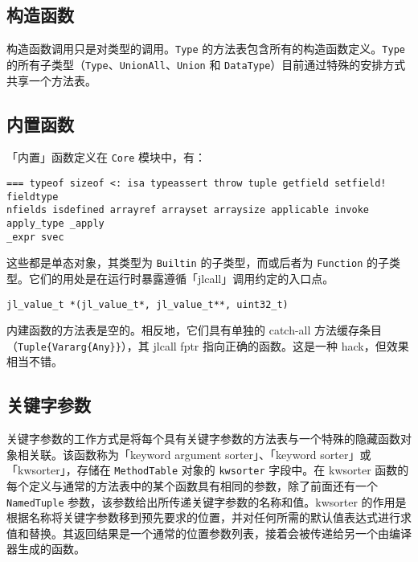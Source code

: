 \hypertarget{5490460475085720426}{}


\subsection{构造函数}



构造函数调用只是对类型的调用。\texttt{Type} 的方法表包含所有的构造函数定义。\texttt{Type} 的所有子类型（\texttt{Type}、\texttt{UnionAll}、\texttt{Union} 和 \texttt{DataType}）目前通过特殊的安排方式共享一个方法表。



\hypertarget{3874805480384047373}{}


\subsection{内置函数}



「内置」函数定义在 \texttt{Core} 模块中，有：




\begin{lstlisting}
=== typeof sizeof <: isa typeassert throw tuple getfield setfield! fieldtype
nfields isdefined arrayref arrayset arraysize applicable invoke apply_type _apply
_expr svec
\end{lstlisting}



这些都是单态对象，其类型为 \texttt{Builtin} 的子类型，而或后者为 \texttt{Function} 的子类型。它们的用处是在运行时暴露遵循「jlcall」调用约定的入口点。




\begin{lstlisting}
jl_value_t *(jl_value_t*, jl_value_t**, uint32_t)
\end{lstlisting}



内建函数的方法表是空的。相反地，它们具有单独的 catch-all 方法缓存条目（\texttt{Tuple\{Vararg\{Any\}\}}），其 jlcall fptr 指向正确的函数。这是一种 hack，但效果相当不错。



\hypertarget{8084690442149965313}{}


\subsection{关键字参数}



关键字参数的工作方式是将每个具有关键字参数的方法表与一个特殊的隐藏函数对象相关联。该函数称为「keyword argument sorter」、「keyword sorter」或「kwsorter」，存储在 \texttt{MethodTable} 对象的 \texttt{kwsorter} 字段中。在 kwsorter 函数的每个定义与通常的方法表中的某个函数具有相同的参数，除了前面还有一个 \texttt{NamedTuple} 参数，该参数给出所传递关键字参数的名称和值。kwsorter 的作用是根据名称将关键字参数移到预先要求的位置，并对任何所需的默认值表达式进行求值和替换。其返回结果是一个通常的位置参数列表，接着会被传递给另一个由编译器生成的函数。



